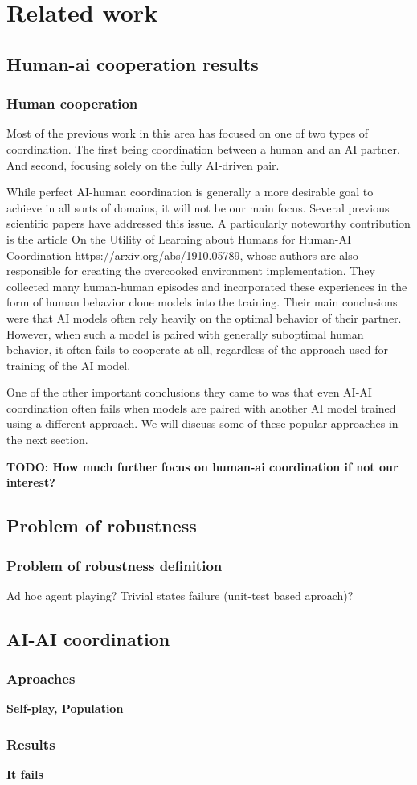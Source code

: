 \chapter{Related work}
\section{Human-ai cooperation results}

\subsection{Human cooperation}
Most of the previous work in this area has focused on one of two types of coordination. 
The first being coordination between a human and an AI partner. 
And second, focusing solely on the fully AI-driven pair.

\par

While perfect AI-human coordination is generally a more desirable goal to achieve in all sorts of domains, it will not be our main focus.  
Several previous scientific papers have addressed this issue. A particularly noteworthy contribution is the article 
On the Utility of Learning about Humans for Human-AI Coordination
\url{https://arxiv.org/abs/1910.05789}, whose authors are also responsible for creating the overcooked environment implementation. 
They collected many human-human episodes and incorporated these experiences in the form of human behavior clone models into the training. Their main conclusions were that AI models often rely heavily on the optimal behavior of their partner. 
However, when such a model is paired with generally suboptimal human behavior, it often fails to cooperate at all, regardless of the approach used for training of the AI model.

One of the other important conclusions they came to was that even AI-AI coordination often fails when models are paired with another AI model trained using a different approach. 
We will discuss some of these popular approaches in the next section.

\textbf{TODO: How much further focus on human-ai coordination if not our interest?}


\section{Problem of robustness}


\subsection{Problem of robustness definition}
Ad hoc agent playing? Trivial states failure (unit-test based aproach)?

\section{AI-AI coordination}
\subsection{Aproaches}
\textbf{Self-play, Population}

\subsection{Results}
\textbf{It fails}





